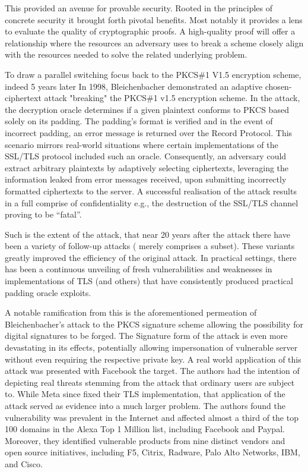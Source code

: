\documentclass[]{final_report}
\theoremstyle{definition}
\begin{document}
This provided an avenue for provable security. Rooted in the principles of concrete security it brought forth pivotal benefits. Most notably it provides a lens to evaluate the quality of cryptographic proofs. A high-quality proof will offer a relationship where the resources an adversary uses to break a scheme closely align with the resources needed to solve the related underlying problem.

To draw a parallel switching focus back to the PKCS\#1 V1.5 encryption scheme, indeed 5 years later In 1998, Bleichenbacher demonstrated an adaptive chosen-ciphertext attack  "breaking" the PKCS\#1 v1.5 encryption scheme. In the attack, the decryption oracle determines if a given plaintext conforms to PKCS based solely on its padding. The padding’s format is verified and in the event of incorrect padding, an error message is returned over the Record Protocol. This scenario mirrors real-world situations where certain implementations of the SSL/TLS protocol included such an oracle. Consequently, an adversary could extract arbitrary plaintexts by adaptively selecting ciphertexts, leveraging the information leaked from error messages received, upon submitting incorrectly formatted ciphertexts to the server.  A successful realisation of the attack results in a full comprise of confidentiality e.g., the destruction of the SSL/TLS channel proving to be “fatal”. 

Such is the extent of the attack, that near 20 years after the attack there have been a variety of follow-up attacks   (\cite{coppersmith1996low, coron2000new, 10.1007/978-3-540-45238-6_33, degabriele2012joint, bardou2012efficient, meyer2014revisiting, zhang2014cross, jager2015security, jager2015practical, bock2018return} merely comprises a subset). These variants greatly improved the efficiency of the original attack. In practical settings, there has been a continuous unveiling of fresh vulnerabilities and weaknesses in implementations of TLS (and others) that have consistently produced practical padding oracle exploits.

A notable ramification from this is the aforementioned permeation of Bleichenbacher's attack to the PKCS signature scheme \cite{finney2006bleichenbacher, kuhn2008variants} allowing the possibility for digital signatures to be forged. The Signature form of the attack is even more devastating in its effects, potentially allowing impersonation of vulnerable server without even requiring the respective private key. A real world application of this attack was presented \cite{bock2018return} with Facebook the target. The authors had the intention of depicting real threats stemming from the attack that ordinary users are subject to. While Meta since fixed their TLS implementation, that application of the attack served as evidence into a much larger problem. The authors \cite{bock2018return} found the vulnerability was prevalent in the Internet and affected almost a third of the top 100 domains in the Alexa Top 1 Million list, including Facebook and Paypal. Moreover, they identified vulnerable products from nine distinct vendors and open source initiatives, including F5, Citrix, Radware, Palo Alto Networks, IBM, and Cisco.
\end{document}
